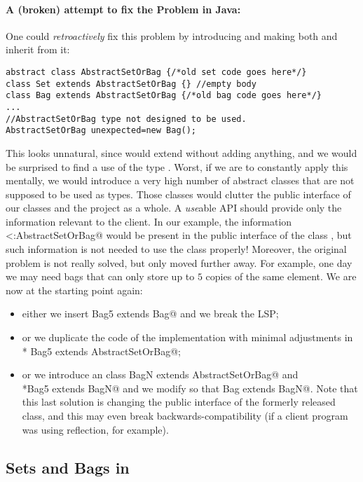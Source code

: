 \paragraph{A (broken) attempt to fix the Problem in Java:}
One could \emph{retroactively} fix this problem by introducing \Q@AbstractSetOrBag@
and making both \Q@Bag@ and \Q@Set@ inherit from it:
\begin{lstlisting}
abstract class AbstractSetOrBag {/*old set code goes here*/}
class Set extends AbstractSetOrBag {} //empty body
class Bag extends AbstractSetOrBag {/*old bag code goes here*/}
...
//AbstractSetOrBag type not designed to be used.
AbstractSetOrBag unexpected=new Bag(); 
\end{lstlisting}
This looks unnatural, since \Q@Set@ would extend \Q@AbstractSetOrBag@ without adding anything,
and we would be surprised to find a use of the type \Q@AbstractSetOrBag@.
Worst, if we are to constantly apply this mentally, we would introduce a very high number
of abstract classes that are not supposed to be used as types. Those classes would clutter the 
public interface of our classes and the project as a whole.
A \emph{use}able API should provide only the information relevant to the client.
In our example, the information \Q@Set<:AbstractSetOrBag@ would be present in the public interface
of the class \Q@Set@, but such information is not needed to use the class properly!
Moreover, the original problem is not really solved, but only moved 
further away. For example, one day  we may need bags that can only store up to $5$ copies of the same element.
We are now at the starting point again:
\begin{itemize}
\item either we insert \Q@class Bag5 extends Bag@ and we break the LSP; 
\item or we duplicate the code of the \Q@Bag@ implementation with minimal
  adjustments in \\* \Q@class Bag5 extends AbstractSetOrBag@;
\item or we introduce an
\Q@abstract class BagN extends AbstractSetOrBag@ and \\*\Q@class Bag5 extends BagN@
and we modify \Q@Bag@ so that  \Q@class Bag extends BagN@.
Note that this last solution is changing the public interface of the formerly released \Q@Bag@ class, and
this may even break backwards-compatibility (if a client program was using
reflection, for example).
\end{itemize}

\subsection{Sets and Bags in \name}

